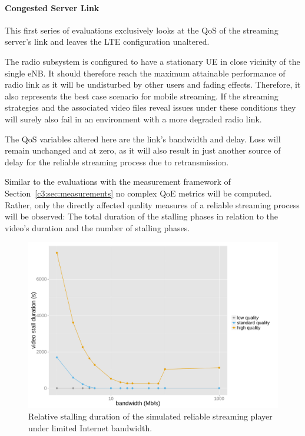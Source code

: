 \paragraph{Congested Server Link}

This first series of evaluations exclusively looks at the \gls{QoS} of the streaming server's link and leaves the \gls{LTE} configuration unaltered.

The radio subsystem is configured to have a stationary \gls{UE} in close vicinity of the single \gls{eNB}. It should therefore reach the maximum attainable performance of radio link as it will be undisturbed by other users and fading effects. Therefore, it also represents the best case scenario for mobile streaming. If the streaming strategies and the associated video files reveal issues under these conditions they will surely also fail in an environment with a more degraded radio link.

The \gls{QoS} variables altered here are the link's bandwidth and delay. Loss will remain unchanged and at zero, as it will also result in just another source of delay for the reliable streaming process due to retransmission. 

Similar to the evaluations with the measurement framework of Section~\ref{c3:sec:measurements} no complex \gls{QoE} metrics will be computed. Rather, only the directly affected quality measures of a reliable streaming process will be observed: The total duration of the stalling phases in relation to the video's duration and the number of stalling phases.

\begin{figure}[htb]
	\centering
	\includegraphics[width=1.0\textwidth]{images/R-ltesim-bwseries-stallduration.pdf}
	\caption{Relative stalling duration of the simulated reliable streaming player under limited Internet bandwidth.}
\label{c6:fig:ltesim-bwseries-stallduration}
\end{figure}

